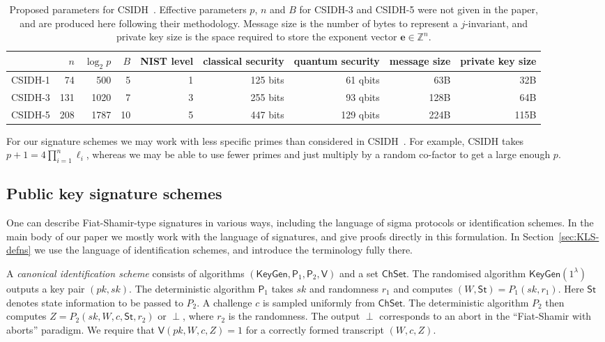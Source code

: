 \documentclass{llncs}
\newcommand{\Z}{\mathbb{Z}}
\newcommand{\e}{\mathbf{e}}
\newcommand{\KeyGen}{\mathsf{KeyGen}}
\newcommand{\PP}{\mathsf{P}}
\newcommand{\VV}{\mathsf{V}}
\newcommand{\ChSet}{\textsf{ChSet}}
\newcommand{\St}{\textsf{St}}
\begin{document}
\begin{table}
  \centering
  \begin{tabular}{l | r | r | r | r | r | r | r | r}
    & $n$ & $\log_2 p$ & $B$ & NIST level & classical security & quantum security & message size & private key size \\
    \hline
    CSIDH-1 &  74 &  500 &  5 & 1 & 125 bits &  61 qbits &  63B &  32B\\
    CSIDH-3 & 131 & 1020 &  7 & 3 & 255 bits &  93 qbits & 128B &  64B\\
    CSIDH-5 & 208 & 1787 & 10 & 5 & 447 bits & 129 qbits & 224B & 115B
  \end{tabular}
  \caption{Proposed parameters for CSIDH~\cite{CLMPR18}.  Effective
    parameters $p$, $n$ and $B$ for CSIDH-3 and CSIDH-5 were not given
    in the paper, and are produced here following their methodology.
    Message size is the number of bytes to represent a $j$-invariant, and private key size is the space required to store the exponent vector $\e \in \Z^n$.}
  \label{tab:csidh-parms}
\end{table}




For our signature schemes we may work with less specific primes than considered in CSIDH~\cite{CLMPR18}. For example, CSIDH takes $p+1 = 4\prod_{i=1}^n\ell_i$, whereas we may be able to use fewer primes and just multiply by a random co-factor to get a large enough $p$.




\subsection{Public key signature schemes}

One can describe Fiat-Shamir-type signatures in various ways, including the language of sigma protocols or identification schemes.
In the main body of our paper we mostly work with the language of signatures, and give proofs directly in this formulation.
In Section~\ref{sec:KLS-defns} we use the language of identification schemes, and introduce the terminology fully there.

A \emph{canonical identification scheme} consists of algorithms $(\KeyGen, \PP_1, \PP_2, \VV)$ and a set $\ChSet$. The randomised algorithm $\KeyGen( 1^\lambda )$ outputs a key pair $(pk,sk)$.
The deterministic algorithm $\PP_1$ takes $sk$ and randomness $r_1$ and computes $(W, \St) = P_1( sk, r_1 )$. 
Here $\St$ denotes state information to be passed to $P_2$.
A challenge $c$ is sampled uniformly from $\ChSet$. The deterministic algorithm $P_2$ then computes $Z = P_2( sk, W, c, \St, r_2 )$ or $\perp$, where $r_2$ is the randomness.
The output $\perp$ corresponds to an abort in the ``Fiat-Shamir with aborts'' paradigm.
We require that $\VV( pk, W, c, Z ) = 1$ for a correctly formed transcript $(W,c,Z)$.
\end{document}
